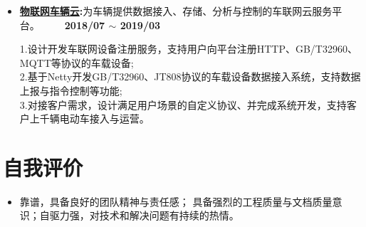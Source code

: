 \documentclass[letterpaper, UTF8, 11pt]{article}
\begin{document}
\begin{itemize}
		\vspace{0.05in}
		
		\item \textbf{\href{https://cloud.baidu.com/product/dugo.html}{物联网车辆云}:}{为车辆提供数据接入、存储、分析与控制的车联网云服务平台。}~~~~~\textbf{2018/07 $\sim$ 2019/03}
		
		1.设计开发车联网设备注册服务，支持用户向平台注册HTTP、GB/T32960、MQTT等协议的车载设备;\\
		2.基于Netty开发GB/T32960、JT808协议的车载设备数据接入系统，支持数据上报与指令控制等功能;\\
		3.对接客户需求，设计满足用户场景的自定义协议、并完成系统开发，支持客户上千辆电动车接入与运营。
		
		\vspace{0.05in}
		
	\end{itemize}
	\vspace{-0.25in}
	
	\section*{\textbf{自我评价}}\vspace{-0.1in}
	\begin{itemize}	
		\item 靠谱，具备良好的团队精神与责任感；
		具备强烈的工程质量与文档质量意识；自驱力强，对技术和解决问题有持续的热情。
	\end{itemize}
	\vspace{-0.25in}
\end{document}
